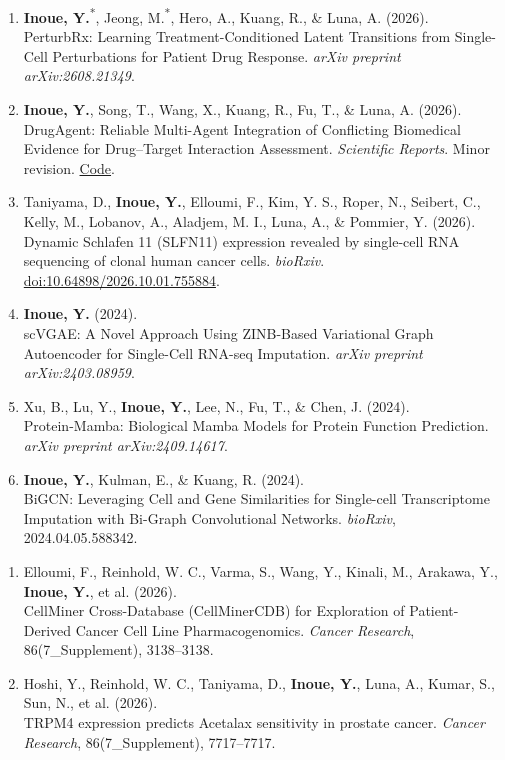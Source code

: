 \documentclass[11pt]{article}
\newcommand{\publication}[3]{%
  \entryspace\item #1\\
  #2. #3
}
\begin{document}

\begin{enumerate}[label={P\arabic*.}]

  \publication
  {\textbf{Inoue, Y.}\textsuperscript{*}, Jeong, M.\textsuperscript{*}, Hero, A., Kuang, R., \& Luna, A. (2026).}
  {PerturbRx: Learning Treatment-Conditioned Latent Transitions from Single-Cell Perturbations for Patient Drug Response}
  {\textit{arXiv preprint arXiv:2608.21349}.}

  \publication
  {\textbf{Inoue, Y.}, Song, T., Wang, X., Kuang, R., Fu, T., \& Luna, A. (2026).}
  {DrugAgent: Reliable Multi-Agent Integration of Conflicting Biomedical Evidence for Drug--Target Interaction Assessment}
  {\textit{Scientific Reports}. Minor revision. \href{https://github.com/inoue0426/DrugAgent}{Code}.}

  \publication
  {Taniyama, D., \textbf{Inoue, Y.}, Elloumi, F., Kim, Y. S., Roper, N., Seibert, C., Kelly, M., Lobanov, A., Aladjem, M. I., Luna, A., \& Pommier, Y. (2026).}
  {Dynamic Schlafen 11 (SLFN11) expression revealed by single-cell RNA sequencing of clonal human cancer cells}
  {\textit{bioRxiv}. \href{https://doi.org/10.64898/2026.10.01.755884}{doi:10.64898/2026.10.01.755884}.}

  \publication
  {\textbf{Inoue, Y.} (2024).}
  {scVGAE: A Novel Approach Using ZINB-Based Variational Graph Autoencoder for Single-Cell RNA-seq Imputation}
  {\textit{arXiv preprint arXiv:2403.08959}.}

  \publication
  {Xu, B., Lu, Y., \textbf{Inoue, Y.}, Lee, N., Fu, T., \& Chen, J. (2024).}
  {Protein-Mamba: Biological Mamba Models for Protein Function Prediction}
  {\textit{arXiv preprint arXiv:2409.14617}.}

  \publication
  {\textbf{Inoue, Y.}, Kulman, E., \& Kuang, R. (2024).}
  {BiGCN: Leveraging Cell and Gene Similarities for Single-cell Transcriptome Imputation with Bi-Graph Convolutional Networks}
  {\textit{bioRxiv}, 2024.04.05.588342.}

\end{enumerate}


\begin{enumerate}[label={A\arabic*.}]

  \publication
  {Elloumi, F., Reinhold, W. C., Varma, S., Wang, Y., Kinali, M., Arakawa, Y., \textbf{Inoue, Y.}, et al. (2026).}
  {CellMiner Cross-Database (CellMinerCDB) for Exploration of Patient-Derived Cancer Cell Line Pharmacogenomics}
  {\textit{Cancer Research}, 86(7\_Supplement), 3138--3138.}

  \publication
  {Hoshi, Y., Reinhold, W. C., Taniyama, D., \textbf{Inoue, Y.}, Luna, A., Kumar, S., Sun, N., et al. (2026).}
  {TRPM4 expression predicts Acetalax sensitivity in prostate cancer}
  {\textit{Cancer Research}, 86(7\_Supplement), 7717--7717.}

\end{enumerate}
\end{document}
